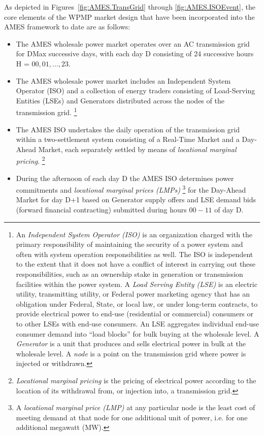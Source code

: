 \documentclass[12pt]{article}
\begin{document}
As depicted in 
Figures~\ref{fig:AMES.TransGrid} through \ref{fig:AMES.ISOEvent}, 
the core elements of the WPMP market design that 
have been incorporated into the AMES framework to date are as follows:
                 \begin{itemize}
\item
The AMES wholesale power market operates over an AC transmission grid 
for DMax successive days, with each day D consisting of 24 successive hours 
H = $00, 01, \ldots , 23$. 
    
\item
The AMES wholesale power market includes an Independent
System Operator (ISO) and a collection of energy traders consisting of 
Load-Serving Entities (LSEs) and
Generators distributed across the nodes of the transmission grid.%
       \footnote{An \textit{Independent System Operator (ISO)\/} is an
organization charged with the primary responsibility of maintaining the
security of a power system and often with system operation responsibilities
as well.  The ISO is independent to the extent that it does not have a
conflict of interest in carrying out these responsibilities, such as an
ownership stake in generation or transmission facilities within the power
system.  A \textit{Load Serving Entity (LSE)\/} is an electric utility,
transmitting utility, or Federal power marketing agency that has an
obligation under Federal, State, or local law, or under long-term contracts,
to provide electrical power to end-use (residential or commercial) consumers
or to other LSEs with end-use consumers.  An LSE aggregates individual
end-use consumer demand into ``load blocks'' for bulk buying at the wholesale
level.  A \textit{Generator\/} is a unit that produces and sells electrical
power in bulk at the wholesale level. A \textit{node\/} is a point on the transmission 
grid where power is injected or withdrawn.}

\item
The AMES ISO undertakes the daily operation of the transmission grid within a two-settlement system consisting
of a Real-Time Market and a Day-Ahead Market, each separately settled by means of \textit{locational marginal pricing\/}.%
     \footnote{\textit{Locational marginal pricing\/} is the pricing of electrical
power according to the location of its withdrawal from, or injection into, a
transmission grid.}   

\item
During the afternoon of each day D the AMES ISO determines power commitments and \textit{locational marginal prices (LMPs)\/}%
     \footnote{A \textit{locational marginal price (LMP)\/} at any particular node is the least cost 
     of meeting demand at that node for one additional unit of power, i.e. for one additional megawatt (MW).} 
for the Day-Ahead Market for day D+1 based on Generator supply offers and LSE demand bids (forward financial
contracting) submitted during hours $00-11$ of day D.    



\end{itemize}
\end{document}
